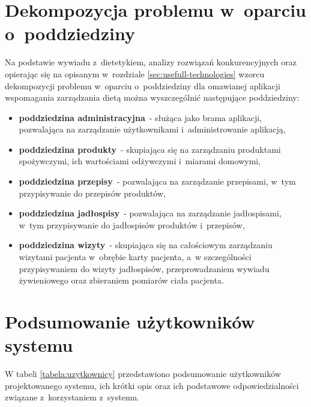 \section{Dekompozycja problemu w~oparciu o~poddziedziny}\label{sec:problem-decomposition}
\par
Na podstawie wywiadu z~dietetykiem, analizy rozwiązań konkurencyjnych oraz opierając się
na opisanym w~rozdziale \ref{sec:usefull-technologies} wzorcu dekompozycji problemu w~oparciu o~poddziedziny
dla omawianej aplikacji wspomagania zarządzania dietą można wyszczególnić następujące poddziedziny:
\begin{itemize}
    \item \textbf{poddziedzina administracyjna}~- służąca jako brama aplikacji, pozwalająca na zarządzanie użytkownikami i~administrowanie aplikacją,
    \item \textbf{poddziedzina produkty}~- skupiająca się na zarządzaniu produktami spożywczymi, ich wartościami odżywczymi i~miarami domowymi,
    \item \textbf{poddziedzina przepisy}~- pozwalająca na zarządzanie przepisami, w~tym przypisywanie do przepisów produktów,
    \item \textbf{poddziedzina jadłospisy}~- pozwalająca na zarządzanie jadłospisami, w~tym przypisywanie do jadłospisów produktów i~przepisów,
    \item \textbf{poddziedzina wizyty}~- skupiająca się na całościowym zarządzaniu wizytami pacjenta w~obrębie karty pacjenta, a~w szczególności przypisywaniem do wizyty jadłospisów, przeprowadzaniem wywiadu żywieniowego oraz zbieraniem pomiarów ciała pacjenta.
\end{itemize}

\section{Podsumowanie użytkowników systemu}\label{sec:users-summary}
\par
W tabeli \ref{tabela:uzytkownicy} przedstawiono podsumowanie użytkowników projektowanego systemu, ich krótki opis oraz ich podstawowe odpowiedzialności związane z~korzystaniem z~systemu.


